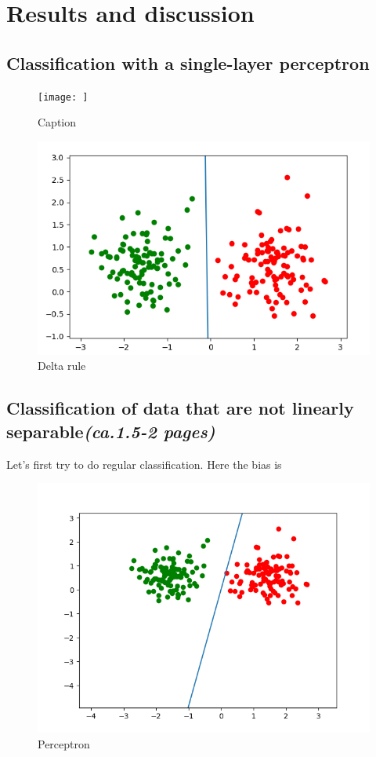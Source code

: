 \documentclass[a4paper]{article}
\begin{document}
\section{Results and discussion}
\subsection{Classification with a single-layer perceptron}

\begin{figure}
    \centering
    \texttt{[image: ]}
    \caption{Caption}
    \label{fig:enter-label}
\end{figure}
\begin{figure}
    \centering
    \includegraphics{Labs/Lab 1/Lab 1a/Results/Delta-linear-seperable.png}
    \caption{Delta rule}
    \label{fig:Delta Rule}
\end{figure}

\subsection{Classification of data that are not linearly separable\textit{(ca.1.5-2 pages)}}
Let's first try to do regular classification. Here the bias is 

\begin{figure}
    \centering
    \includegraphics{Labs/Lab 1/Lab 1a/Results/perceptron-linearly-seperable.png}
    \caption{Perceptron}
    \label{fig:Perceptron-withBias}
\end{figure}
\end{document}
